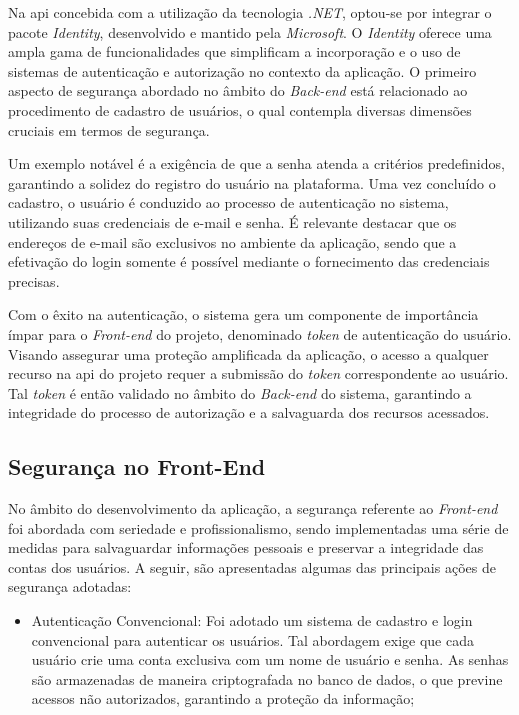 Na \ac{api} concebida com a utilização da tecnologia \textit{\gls{.NET}}, optou-se por integrar o pacote \textit{\gls{Identity}}, desenvolvido e mantido pela \textit{\gls{Microsoft}}. O \textit{\gls{Identity}} oferece uma ampla gama de funcionalidades que simplificam a incorporação e o uso de sistemas de autenticação e autorização no contexto da aplicação. O primeiro aspecto de segurança abordado no âmbito do \textit{\gls{Back-end}} está relacionado ao procedimento de cadastro de usuários, o qual contempla diversas dimensões cruciais em termos de segurança.

Um exemplo notável é a exigência de que a senha atenda a critérios predefinidos, garantindo a solidez do registro do usuário na plataforma. Uma vez concluído o cadastro, o usuário é conduzido ao processo de autenticação no sistema, utilizando suas credenciais de e-mail e senha. É relevante destacar que os endereços de e-mail são exclusivos no ambiente da aplicação, sendo que a efetivação do login somente é possível mediante o fornecimento das credenciais precisas.

Com o êxito na autenticação, o sistema gera um componente de importância ímpar para o \textit{\gls{Front-end}} do projeto, denominado \textit{token} de autenticação do usuário. Visando assegurar uma proteção amplificada da aplicação, o acesso a qualquer recurso na \ac{api} do projeto requer a submissão do \textit{token} correspondente ao usuário. Tal \textit{token} é então validado no âmbito do \textit{\gls{Back-end}} do sistema, garantindo a integridade do processo de autorização e a salvaguarda dos recursos acessados.

\subsection{Segurança no Front-End}

No âmbito do desenvolvimento da aplicação, a segurança referente ao \textit{\gls{Front-end}} foi abordada com seriedade e profissionalismo, sendo implementadas uma série de medidas para salvaguardar informações pessoais e preservar a integridade das contas dos usuários. A seguir, são apresentadas algumas das principais ações de segurança adotadas:

\begin{itemize}
    \item Autenticação Convencional: Foi adotado um sistema de cadastro e login convencional para autenticar os usuários. Tal abordagem exige que cada usuário crie uma conta exclusiva com um nome de usuário e senha. As senhas são armazenadas de maneira criptografada no banco de dados, o que previne acessos não autorizados, garantindo a proteção da informação;
\end{itemize}

